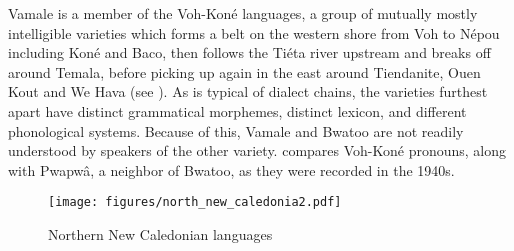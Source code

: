 Vamale is a member of the Voh-Koné languages, a group of mutually mostly intelligible varieties which forms a belt on the western shore from Voh to Népou including Koné and Baco, then follows the Tiéta river upstream and breaks off around Temala, before picking up again in the east around Tiendanite, Ouen Kout and We Hava (see ). As is typical of dialect chains, the varieties furthest apart have distinct grammatical morphemes, distinct lexicon, and different phonological systems. Because of this, Vamale and Bwatoo are not readily understood by speakers of the other variety.  compares Voh-Koné pronouns, along with Pwapwâ, a neighbor of Bwatoo, as they were recorded in the 1940s.  %
 
\begin{figure}
	\texttt{[image: figures/north\_new\_caledonia2.pdf]}
	\caption{Northern New Caledonian languages \parencite[45]{ozanne-rivierre_structural_1995}}
	\label{map:North}
\end{figure}

